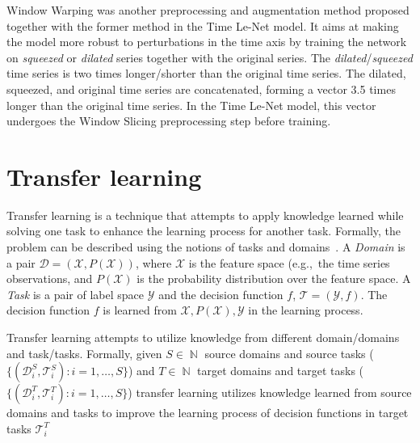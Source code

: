 \documentclass[a4paper,11pt,twoside]{report}
\theoremstyle{definition}
\DeclareMathOperator{\natur}{\mathbb{N}}
\begin{document}
Window Warping was another preprocessing and augmentation method proposed together with the former method in the Time Le-Net model. It aims at making the model more robust to perturbations in the time axis by training the network on \textit{squeezed} or \textit{dilated} series together with the original series. The \textit{dilated}/\textit{squeezed} time series is two times longer/shorter than the original time series.
The dilated, squeezed, and original time series are concatenated, forming a vector 3.5 times longer than the original time series. In the Time Le-Net model, this vector undergoes the Window Slicing preprocessing step before training.



\section{Transfer learning}
Transfer learning is a technique that attempts to apply knowledge learned  while solving one task to enhance the learning process for another task. Formally, the problem can be described using the notions of tasks and domains~\cite{survey_transfer_learning, comp_survey_transfer_leaerning}. A \textit{Domain} is a pair $\mathcal{D}=(\mathcal{X}, P(\mathcal{X}))$, where $\mathcal{X}$ is the feature space (e.g.,~the time series observations, and $P(\mathcal{X})$ is the probability distribution over the feature space. A \textit{Task} is a pair of label space $\mathcal{Y}$ and the decision function $f$, $\mathcal{T} = (\mathcal{Y}, f)$. The decision function $f$ is learned from $\mathcal{X}, P(\mathcal{X}), \mathcal{Y}$ in the learning process.

Transfer learning attempts to utilize knowledge from different domain/domains and task/tasks. Formally, given $S \in \natur$ source domains and source tasks ($\{(\mathcal{D}_i^S,\mathcal{T}_i^S): i=1, \dots, S \}$) and $T \in \natur$ target domains and target tasks ($\{(\mathcal{D}_i^T,\mathcal{T}_i^T): i=1, \dots, S \}$) transfer learning utilizes knowledge learned from source domains and tasks to improve the learning process of decision functions in target tasks $\mathcal{T}_i^T$
\end{document}
